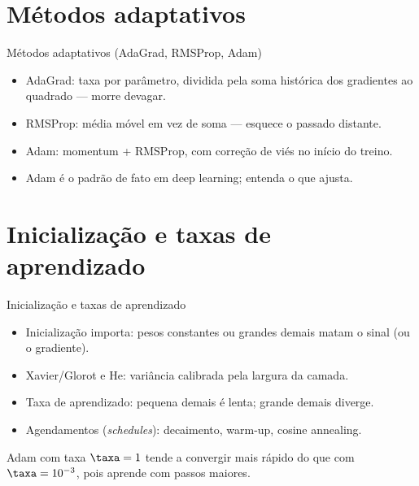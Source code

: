 \documentclass[aspectratio=169, 11pt]{beamer}
\begin{document}
\section{Métodos adaptativos}

\begin{frame}{Métodos adaptativos (AdaGrad, RMSProp, Adam)}
  \begin{itemize}\setlength{\itemsep}{0.4ex}
    \item AdaGrad: taxa por parâmetro, dividida pela soma histórica dos
          gradientes ao quadrado — morre devagar.
    \item RMSProp: média móvel em vez de soma — esquece o passado distante.
    \item Adam: momentum + RMSProp, com correção de viés no início do treino.
    \item Adam é o padrão de fato em deep learning; entenda o que ajusta.
  \end{itemize}
\end{frame}

\section{Inicialização e taxas de aprendizado}

\begin{frame}{Inicialização e taxas de aprendizado}
  \begin{itemize}\setlength{\itemsep}{0.4ex}
    \item Inicialização importa: pesos constantes ou grandes demais matam o
          sinal (ou o gradiente).
    \item Xavier/Glorot e He: variância calibrada pela largura da camada.
    \item Taxa de aprendizado: pequena demais é lenta; grande demais diverge.
    \item Agendamentos (\emph{schedules}): decaimento, warm-up, cosine annealing.
  \end{itemize}
  \begin{quizbox}
    Adam com taxa $\taxa = 1$ tende a convergir mais rápido do que com
    $\taxa = 10^{-3}$, pois aprende com passos maiores.

    \smallskip
  \end{quizbox}
\end{frame}
\end{document}

